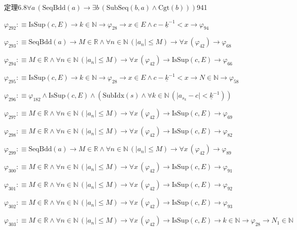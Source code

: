 \begin{fullproof}{定理6.8}{$\forall a\,(\mathrm{SeqBdd}(a) \to \exists b\,(\mathrm{SubSeq}(b,a) \land \mathrm{Cgt}(b)))$}{941}
\begin{abbrevlist}
\item $\varphi_{292} :\equiv \mathrm{IsSup}(c,E) \to k \in \mathbb{N} \to \varphi_{28} \to x \in E \land c - \underline{k}^{-1} < x \to \varphi_{94}$
\item $\varphi_{293} :\equiv \mathrm{SeqBdd}(a) \to M \in \mathbb{R} \land \forall n \in \mathbb{N}\,(\lvert a_{n} \rvert \leq M) \to \forall x\,(\varphi_{42}) \to \varphi_{68}$
\item $\varphi_{294} :\equiv M \in \mathbb{R} \land \forall n \in \mathbb{N}\,(\lvert a_{n} \rvert \leq M) \to \forall x\,(\varphi_{42}) \to \mathrm{IsSup}(c,E) \to \varphi_{66}$
\item $\varphi_{295} :\equiv \mathrm{IsSup}(c,E) \to k \in \mathbb{N} \to \varphi_{28} \to x \in E \land c - \underline{k}^{-1} < x \to N \in \mathbb{N} \to \varphi_{58}$
\item $\varphi_{296} :\equiv \varphi_{182} \land \mathrm{IsSup}(c,E) \land (\mathrm{SubIdx}(s) \land \forall k \in \mathbb{N}\,(\lvert a_{s_{k}} - c \rvert < \underline{k}^{-1}))$
\item $\varphi_{297} :\equiv M \in \mathbb{R} \land \forall n \in \mathbb{N}\,(\lvert a_{n} \rvert \leq M) \to \forall x\,(\varphi_{42}) \to \mathrm{IsSup}(c,E) \to \varphi_{69}$
\item $\varphi_{298} :\equiv M \in \mathbb{R} \land \forall n \in \mathbb{N}\,(\lvert a_{n} \rvert \leq M) \to \forall x\,(\varphi_{42}) \to \mathrm{IsSup}(c,E) \to \varphi_{82}$
\item $\varphi_{299} :\equiv \mathrm{SeqBdd}(a) \to M \in \mathbb{R} \land \forall n \in \mathbb{N}\,(\lvert a_{n} \rvert \leq M) \to \forall x\,(\varphi_{42}) \to \varphi_{89}$
\item $\varphi_{300} :\equiv M \in \mathbb{R} \land \forall n \in \mathbb{N}\,(\lvert a_{n} \rvert \leq M) \to \forall x\,(\varphi_{42}) \to \mathrm{IsSup}(c,E) \to \varphi_{91}$
\item $\varphi_{301} :\equiv M \in \mathbb{R} \land \forall n \in \mathbb{N}\,(\lvert a_{n} \rvert \leq M) \to \forall x\,(\varphi_{42}) \to \mathrm{IsSup}(c,E) \to \varphi_{92}$
\item $\varphi_{302} :\equiv M \in \mathbb{R} \land \forall n \in \mathbb{N}\,(\lvert a_{n} \rvert \leq M) \to \forall x\,(\varphi_{42}) \to \mathrm{IsSup}(c,E) \to \varphi_{93}$
\item $\varphi_{303} :\equiv M \in \mathbb{R} \land \forall n \in \mathbb{N}\,(\lvert a_{n} \rvert \leq M) \to \forall x\,(\varphi_{42}) \to \mathrm{IsSup}(c,E) \to k \in \mathbb{N} \to \varphi_{28} \to N_{1} \in \mathbb{N}$

\end{abbrevlist}
\end{fullproof}
